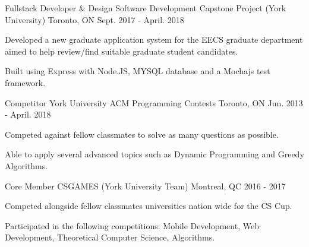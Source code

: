


\begin{cventries}


\cventry
{Fullstack Developer \& Design} %
{Software Development Capstone Project (York University)} %
{Toronto, ON} %
{Sept. 2017 - April. 2018} %
{ %
\begin{cvitems}
\item {Developed a new graduate application system for the EECS graduate department aimed to help review/find suitable graduate student candidates.}
\item {Built using Express with Node.JS, MYSQL database and a Mochajs test framework.}
\end{cvitems}
}

\cventry
{Competitor} %
{York University ACM Programming Contests} %
{Toronto, ON} %
{Jun. 2013 - April. 2018} %
{ %
\begin{cvitems}
\item {Competed against fellow classmates to solve as many questions as possible.}
\item {Able to apply several advanced topics such as Dynamic Programming and Greedy Algorithms.}
\end{cvitems}
}


\cventry
{Core Member} %
{CSGAMES (York University Team)} %
{Montreal, QC} %
{2016 - 2017} %
{ %
\begin{cvitems}
\item {Competed alongside fellow classmates universities nation wide for the CS Cup.}
\item {Participated in the following competitions: Mobile Development, Web Development, Theoretical Computer Science, Algorithms.}
\end{cvitems}
}


\end{cventries}